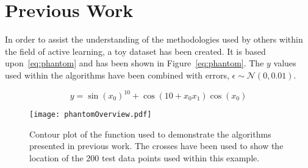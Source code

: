 
\chapter{Previous Work}
\label{ch:2}

\graphicspath{{Chapter2/Figs/Vector/}{Chapter2/Figs/Raster/}}







In order to assist the understanding of the methodologies used by others within the field of active learning, a toy dataset has been created. It is based upon~\ref{eq:phantom} and has been shown in Figure~\ref{eq:phantom}. The $y$ values used within the algorithms have been combined with errors, $\epsilon{}\sim{}\mathcal{N}(0, 0.01)$.

\begin{equation}
  y = \sin{(x_0)}^{10} + \cos{(10 + x_0 x_1)}\cos{(x_0)}
  \label{eq:phantom}
\end{equation}

\begin{figure}[h]
  \begin{center}
    \texttt{[image: phantomOverview.pdf]}
    \caption[Example Dataset for Representation of Ideas]{Contour plot of the function used to demonstrate the algorithms presented in previous work. The crosses have been used to show the location of the 200 test data points used within this example.}
    \label{fig:phantom}
  \end{center}
\end{figure}

